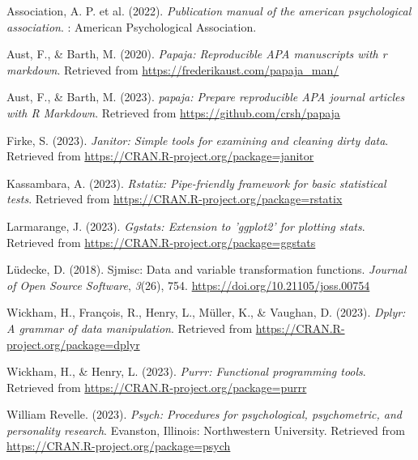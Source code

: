 \documentclass[
  doc]{apa6}
\newlength{\cslhangindent}
\newlength{\cslentryspacingunit} %
\newenvironment{CSLReferences}[2] %
 {%
  \setlength{\parindent}{0pt}
  \ifodd #1
  \let\oldpar\par
  \def\par{\hangindent=\cslhangindent\oldpar}
  \fi
  \setlength{\parskip}{#2\cslentryspacingunit}
 }%
 {}
\begin{document}
\hypertarget{refs}{}
\begin{CSLReferences}{1}{0}
\leavevmode{}%
Association, A. P. et al. (2022). \emph{Publication manual of the american psychological association}. : American Psychological Association.

\leavevmode{}%
Aust, F., \& Barth, M. (2020). \emph{Papaja: Reproducible APA manuscripts with r markdown}. Retrieved from \url{https://frederikaust.com/papaja_man/}

\leavevmode{}%
Aust, F., \& Barth, M. (2023). \emph{{papaja}: {Prepare} reproducible {APA} journal articles with {R Markdown}}. Retrieved from \url{https://github.com/crsh/papaja}

\leavevmode{}%
Firke, S. (2023). \emph{Janitor: Simple tools for examining and cleaning dirty data}. Retrieved from \url{https://CRAN.R-project.org/package=janitor}

\leavevmode{}%
Kassambara, A. (2023). \emph{Rstatix: Pipe-friendly framework for basic statistical tests}. Retrieved from \url{https://CRAN.R-project.org/package=rstatix}

\leavevmode{}%
Larmarange, J. (2023). \emph{Ggstats: Extension to 'ggplot2' for plotting stats}. Retrieved from \url{https://CRAN.R-project.org/package=ggstats}

\leavevmode{}%
Lüdecke, D. (2018). Sjmisc: Data and variable transformation functions. \emph{Journal of Open Source Software}, \emph{3}(26), 754. \url{https://doi.org/10.21105/joss.00754}

\leavevmode{}%
Wickham, H., François, R., Henry, L., Müller, K., \& Vaughan, D. (2023). \emph{Dplyr: A grammar of data manipulation}. Retrieved from \url{https://CRAN.R-project.org/package=dplyr}

\leavevmode{}%
Wickham, H., \& Henry, L. (2023). \emph{Purrr: Functional programming tools}. Retrieved from \url{https://CRAN.R-project.org/package=purrr}

\leavevmode{}%
William Revelle. (2023). \emph{Psych: Procedures for psychological, psychometric, and personality research}. Evanston, Illinois: Northwestern University. Retrieved from \url{https://CRAN.R-project.org/package=psych}


\end{CSLReferences}
\end{document}
